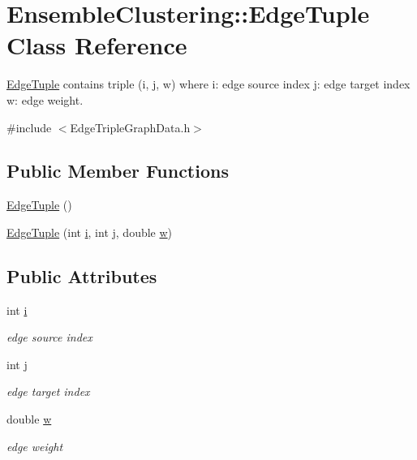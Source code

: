 \hypertarget{class_ensemble_clustering_1_1_edge_tuple}{\section{Ensemble\-Clustering\-:\-:Edge\-Tuple Class Reference}
\label{class_ensemble_clustering_1_1_edge_tuple}
}


\hyperlink{class_ensemble_clustering_1_1_edge_tuple}{Edge\-Tuple} contains triple (i, j, w) where i\-: edge source index j\-: edge target index w\-: edge weight.  




{\ttfamily \#include $<$Edge\-Triple\-Graph\-Data.\-h$>$}

\subsection*{Public Member Functions}
\begin{DoxyCompactItemize}
\item 
\hyperlink{class_ensemble_clustering_1_1_edge_tuple_a5d6d569201ed9d751992e9fa85cb668a}{Edge\-Tuple} ()
\item 
\hyperlink{class_ensemble_clustering_1_1_edge_tuple_a70a0783ed608657fe6c64c87f783be83}{Edge\-Tuple} (int \hyperlink{class_ensemble_clustering_1_1_edge_tuple_acf12140619e42d9e60ccf402caf0730d}{i}, int \hyperlink{class_ensemble_clustering_1_1_edge_tuple_a8f3e5de46a3c3e1eefeda14d6330eaab}{j}, double \hyperlink{class_ensemble_clustering_1_1_edge_tuple_a5dbd8079be78b2057d441f79eae7c905}{w})
\end{DoxyCompactItemize}
\subsection*{Public Attributes}
\begin{DoxyCompactItemize}
\item 
int \hyperlink{class_ensemble_clustering_1_1_edge_tuple_acf12140619e42d9e60ccf402caf0730d}{i}
\begin{DoxyCompactList}\small\item\em edge source index \end{DoxyCompactList}\item 
int \hyperlink{class_ensemble_clustering_1_1_edge_tuple_a8f3e5de46a3c3e1eefeda14d6330eaab}{j}
\begin{DoxyCompactList}\small\item\em edge target index \end{DoxyCompactList}\item 
double \hyperlink{class_ensemble_clustering_1_1_edge_tuple_a5dbd8079be78b2057d441f79eae7c905}{w}
\begin{DoxyCompactList}\small\item\em edge weight \end{DoxyCompactList}\end{DoxyCompactItemize}


